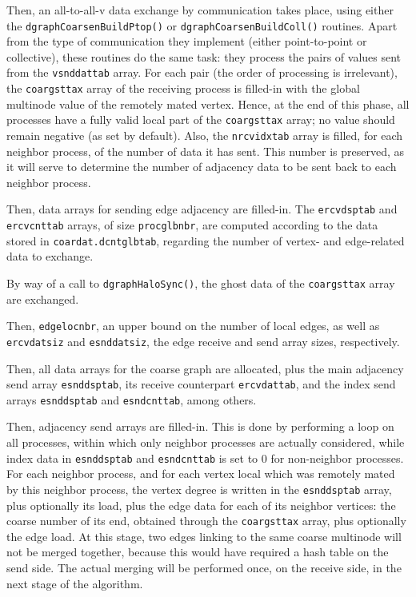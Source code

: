 Then, an all-to-all-v data exchange by communication takes place,
using either the \texttt{dgraph\lbt Coarsen\lbt Build\lbt Ptop()} or
\texttt{dgraph\texttt Coarsen\lbt Build\lbt Coll()} routines.  Apart
from the type of communication they implement (either point-to-point
or collective), these routines do the same task: they process the
pairs of values sent from the \texttt{vsnddattab} array. For each pair
(the order of processing is irrelevant), the \texttt{coargsttax} array
of the receiving process is filled-in with the global multinode value
of the remotely mated vertex. Hence, at the end of this phase, all
processes have a fully valid local part of the \texttt{coargsttax}
array; no value should remain negative (as set by default). Also, the
\texttt{nrcvidxtab} array is filled, for each neighbor process, of the
number of data it has sent. This number is preserved, as it will serve
to determine the number of adjacency data to be sent back to each
neighbor process.

Then, data arrays for sending edge adjacency are filled-in. The
\texttt{ercvdsptab} and \texttt{ercvcnttab} arrays, of size
\texttt{procglbnbr}, are computed according to the data stored in
\texttt{coardat.\lbt dcntglbtab}, regarding the number of vertex- and
edge-related data to exchange.

By way of a call to \texttt{dgraphHaloSync()}, the ghost data of the
\texttt{coargsttax} array are exchanged.

Then, \texttt{edgelocnbr}, an upper bound on the number of local
edges, as well as \texttt{ercvdatsiz} and \texttt{esnddatsiz}, the
edge receive and send array sizes, respectively.

Then, all data arrays for the coarse graph are allocated, plus the
main adjacency send array \texttt{esnddsptab}, its receive counterpart
\texttt{ercvdattab}, and the index send arrays \texttt{esnddsptab} and
\texttt{esndcnttab}, among others.

Then, adjacency send arrays are filled-in. This is done by performing
a loop on all processes, within which only neighbor processes are
actually considered, while index data in \texttt{esnddsptab} and
\texttt{esndcnttab} is set to $0$ for non-neighbor processes. For each
neighbor process, and for each vertex local which was remotely mated
by this neighbor process, the vertex degree is written in the
\texttt{esnddsptab} array, plus optionally its load, plus the edge
data for each of its neighbor vertices: the coarse number of its end,
obtained through the \texttt{coargsttax} array, plus optionally the
edge load. At this stage, two edges linking to the same coarse
multinode will not be merged together, because this would have
required a hash table on the send side. The actual merging will be
performed once, on the receive side, in the next stage of the
algorithm.

